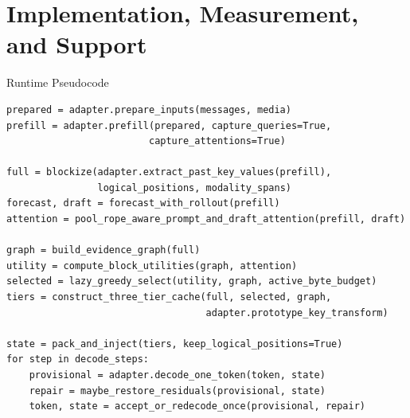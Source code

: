 \documentclass[aspectratio=169,10pt]{beamer}
\begin{document}
\section{Implementation, Measurement, and Support}

\begin{frame}[fragile]{Runtime Pseudocode}
\begin{lstlisting}[style=mosaickv,language={}]
prepared = adapter.prepare_inputs(messages, media)
prefill = adapter.prefill(prepared, capture_queries=True,
                         capture_attentions=True)

full = blockize(adapter.extract_past_key_values(prefill),
                logical_positions, modality_spans)
forecast, draft = forecast_with_rollout(prefill)
attention = pool_rope_aware_prompt_and_draft_attention(prefill, draft)

graph = build_evidence_graph(full)
utility = compute_block_utilities(graph, attention)
selected = lazy_greedy_select(utility, graph, active_byte_budget)
tiers = construct_three_tier_cache(full, selected, graph,
                                   adapter.prototype_key_transform)

state = pack_and_inject(tiers, keep_logical_positions=True)
for step in decode_steps:
    provisional = adapter.decode_one_token(token, state)
    repair = maybe_restore_residuals(provisional, state)
    token, state = accept_or_redecode_once(provisional, repair)
\end{lstlisting}
\end{frame}
\end{document}
